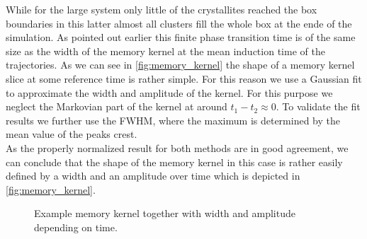 While for the large system only little of the crystallites reached the box boundaries in this latter almost all clusters fill the whole box at the ende of the simulation. As pointed out earlier this finite phase transition time is of the same size as the width of the memory kernel at the mean induction time of the trajectories. As we can see in \autoref{fig:memory_kernel} the shape of a memory kernel slice at some reference time is rather simple. For this reason we use a Gaussian fit to approximate the width and amplitude of the kernel. For this purpose we neglect the Markovian part of the kernel at around $t_1-t_2 \approx 0$. To validate the fit results we further use the FWHM, where the maximum is determined by the mean value of the peaks crest.\\
As the properly normalized result for both methods are in good agreement, we can conclude that the shape of the memory kernel in this case is rather easily defined by a width and an amplitude over time which is depicted in \autoref{fig:memory_kernel}.


\begin{figure}[ht]
\begin{center}
 \hspace{0.5cm}
\caption[Width and amplitude of memory kernel with example slice]{Example memory kernel together with width and amplitude depending on time.}
\label{fig:memory_kernel}
\end{center}
\end{figure}

